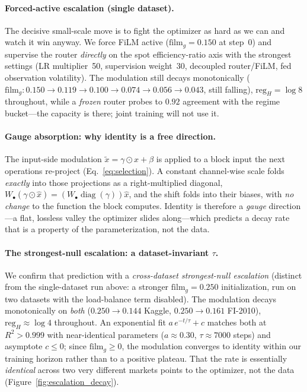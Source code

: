 \documentclass{article}
\DeclareMathOperator{\diagop}{diag}
\newcommand{\diag}{\diagop}
\begin{document}
\paragraph{Forced-active escalation (single dataset).}
The decisive small-scale move is to fight the optimizer as hard as we can and watch
it win anyway. We force FiLM active ($\mathrm{film}_g=0.150$ at step~0) and
supervise the router \emph{directly} on the spot efficiency-ratio axis with the
strongest settings (LR multiplier~50, supervision weight~30, decoupled
router/FiLM, fed observation volatility). The modulation still decays monotonically
($\mathrm{film}_g: 0.150\!\to\!0.119\!\to\!0.100\!\to\!0.074\!\to\!0.056\!\to\!0.043$,
still falling), $\mathrm{reg}_H=\log 8$ throughout, while a \emph{frozen} router
probes to $0.92$ agreement with the regime bucket---the capacity is there; joint
training will not use it.

\paragraph{Gauge absorption: why identity is a free direction.}
The input-side modulation $\tilde{x}=\gamma\odot\hat{x}+\beta$ is applied to a block
input the next operations re-project (Eq.~\eqref{eq:selection}). A constant
channel-wise scale folds \emph{exactly} into those projections as a
right-multiplied diagonal, $W_\bullet(\gamma\odot\hat x)=(W_\bullet\diag(\gamma))\hat x$,
and the shift folds into their biases, with \emph{no change} to the function the
block computes. Identity is therefore a \emph{gauge} direction---a flat, lossless
valley the optimizer slides along---which predicts a decay rate that is a property
of the parameterization, not the data.

\paragraph{The strongest-null escalation: a dataset-invariant $\tau$.}
We confirm that prediction with a \emph{cross-dataset strongest-null escalation}
(distinct from the single-dataset run above: a stronger $\mathrm{film}_g=0.250$
initialization, run on two datasets with the load-balance term disabled). The
modulation decays monotonically on \emph{both} ($0.250\!\to\!0.144$ Kaggle,
$0.250\!\to\!0.161$ FI-2010), $\mathrm{reg}_H\approx\log 4$ throughout. An
exponential fit $a\,e^{-t/\tau}+c$ matches both at $R^2>0.999$ with near-identical
parameters ($a\approx0.30$, $\tau\approx7000$ steps) and asymptote $c\le0$; since
$\mathrm{film}_g\ge0$, the modulation converges to identity within our training
horizon rather than to a positive plateau. That the rate is essentially
\emph{identical} across two very different markets points to the optimizer, not the
data (Figure~\ref{fig:escalation_decay}).
\end{document}
